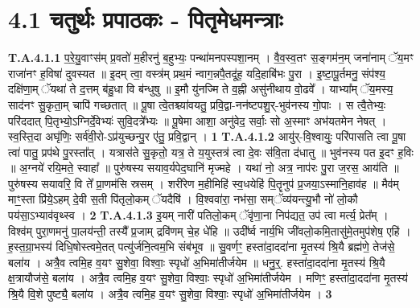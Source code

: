 \documentclass[17pt]{extarticle}
\begin{document}
\section*{ 4.1     चतुर्थः प्रपाठकः - पितृमेधमन्त्राः }
                                \textbf{ T.A.4.1.1} \newline
                  प॒रे॒यु॒वाꣳस॑म् प्र॒वतो॑ म॒हीरनु॑ ब॒हुभ्यः॒ पन्था॑मनपस्पशा॒नम् । वै॒व॒स्व॒तꣳ स॒ङ्गम॑न॒म् जना॑नाम् ॅय॒मꣳ राजा॑नꣳ ह॒विषा॑ दुवस्यत ॥ इ॒दम् त्वा॒ वस्त्र॑म् प्रथ॒मं न्वाग॒न्नपै॒तदू॑ह॒ यदि॒हाबि॑भः पु॒रा ।  इ॒ष्टा॒पू॒र्तमनु॒ संप॑श्य॒ दक्षि॑णा॒म् ॅयथा॑ ते द॒त्तम् ब॑हु॒धा वि ब॑न्धुषु ॥  इ॒मौ यु॑नज्मि ते व॒ह्नी असु॑नीथाय वो॒ढवे᳚ ।  याभ्या᳚म् ॅय॒मस्य॒ साद॑नꣳ सु॒कृता॒म् चापि॑ गच्छतात् ॥ पू॒षा त्वे॒तश्च्या॑वयतु॒ प्रवि॒द्वा-नन॑ष्टपशु॒र्-भुव॑नस्य गो॒पाः ।  स त्वै॒तेभ्यः॒ परि॑ददात् पि॒तृभ्यो॒ऽग्निर्दे॒वेभ्यः॑ सुवि॒दत्रे᳚भ्यः ॥ पू॒षेमा आशा॒ अनु॑वेद॒ सर्वाः॒ सो अ॒स्माꣳ अभ॑यतमेन नेषत् ।  स्व॒स्ति॒दा अघृ॑णिः॒ सर्व॑वी॒रो-ऽप्र॑युच्छन्पु॒र ए॑तु॒ प्रवि॒द्वान् । \textbf{ 1} \newline
                  \newline
                                                                  \textbf{ T.A.4.1.2} \newline
                  आयु॑र्-वि॒श्वायुः॒ परि॑पासति त्वा पू॒षा त्वा॑ पातु॒ प्रप॑थे पु॒रस्ता᳚त् । यत्रास॑ते सु॒कृतो॒ यत्र॒ ते य॒युस्तत्र॑ त्वा दे॒वः स॑वि॒ता द॑धातु ॥  भुव॑नस्य पत इ॒दꣳ ह॒विः ॥ अ॒ग्नये॑ रयि॒मते॒ स्वाहा᳚ ॥ पुरु॑षस्य सयाव॒र्यपेद॒घानि॑ मृज्महे ।  यथा॑ नो॒ अत्र॒ नाप॑रः पु॒रा ज॒रस॒ आय॑ति ॥  पुरु॑षस्य सयावरि॒ वि ते᳚ प्रा॒णम॑सि स्रसम् ।  शरी॑रेण म॒हीमिहि॑ स्व॒धयेहि॑ पि॒तॄनुप॑ प्र॒जया॒ऽस्मानि॒हाव॑ह ॥ मैव॑म् माꣳ॒॒स्ता प्रि॑ये॒ऽहम् दे॒वी स॒ती पि॑तृलो॒कम् ॅयदैषि॑ ।  वि॒श्ववा॑रा॒ नभ॑सा॒ सम्ॅव्य॑यन्त्यु॒भौ नो॑ लो॒कौ  पय॑सा॒ऽभ्याव॑वृथ्स्व । \textbf{ 2} \newline
                  \newline
                                                                  \textbf{ T.A.4.1.3} \newline
                  इ॒यम् नारी॑ पतिलो॒कम् ॅवृ॑णा॒ना निप॑द्यत॒ उप॑ त्वा मर्त्य॒ प्रेत᳚म् । विश्व॑म् पुरा॒णमनु॑ पा॒लय॑न्ती॒ तस्यै᳚ प्र॒जाम् द्रवि॑णम् चे॒ह धे॑हि ॥ उदी᳚र्ष्व नार्य॒भि जी॑वलो॒कमि॒तासु॑मे॒तमुप॑शेष॒ एहि॑ ।  ह॒स्त॒ग्रा॒भस्य॑ दिधि॒षोस्त्वमे॒तत् पत्यु॑र्जनि॒त्वम॒भि संब॑भूव ॥  सु॒वर्णꣳ॒॒ हस्ता॑दा॒ददा॑ना मृ॒तस्य॑ श्रि॒यै ब्रह्म॑णे॒ तेज॑से॒ बला॑य । अत्रै॒व त्वमि॒ह व॒यꣳ सु॒शेवा॒ विश्वाः॒ स्पृधो॑ अ॒भिमा॑तीर्जयेम ॥  धनु॒र्॒. हस्ता॑दा॒ददा॑ना मृ॒तस्य॑ श्रि॒यै क्ष॒त्रायौज॑से॒ बला॑य । अत्रै॒व त्वमि॒ह व॒यꣳ सु॒शेवा॒ विश्वाः॒ स्पृधो॑ अ॒भिमा॑तीर्जयेम ।  मणिꣳ॒॒ हस्ता॑दा॒ददा॑ना मृ॒तस्य॑ श्रि॒यै वि॒शे पुष्ट्यै॒ बला॑य । अत्रै॒व त्वमि॒ह व॒यꣳ सु॒शेवा॒ विश्वाः॒ स्पृधो॑ अ॒भिमा॑तीर्जयेम । \textbf{ 3} \newline
\end{document}

